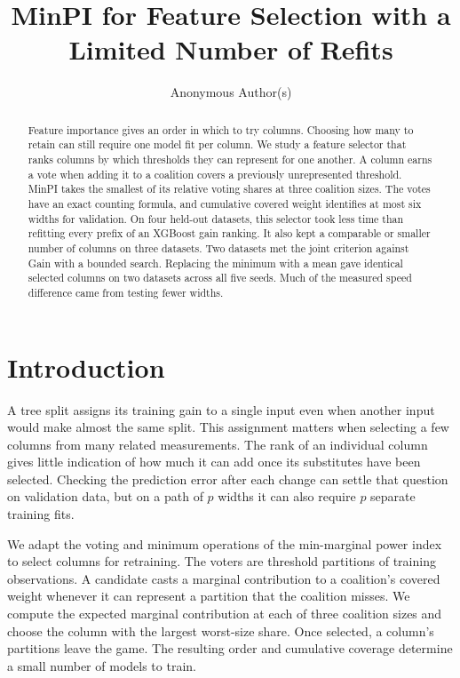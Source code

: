 \documentclass{article}
\title{MinPI for Feature Selection with a Limited Number of Refits}
\author{Anonymous Author(s)}
\begin{document}
\maketitle
\begin{abstract}
Feature importance gives an order in which to try columns. Choosing how many to retain can still require one model fit per column. We study a feature selector that ranks columns by which thresholds they can represent for one another. A column earns a vote when adding it to a coalition covers a previously unrepresented threshold. MinPI takes the smallest of its relative voting shares at three coalition sizes. The votes have an exact counting formula, and cumulative covered weight identifies at most six widths for validation. On four held-out datasets, this selector took less time than refitting every prefix of an XGBoost gain ranking. It also kept a comparable or smaller number of columns on three datasets. Two datasets met the joint criterion against Gain with a bounded search. Replacing the minimum with a mean gave identical selected columns on two datasets across all five seeds. Much of the measured speed difference came from testing fewer widths.
\end{abstract}

\section{Introduction}
A tree split assigns its training gain to a single input even when another input would make almost the same split. This assignment matters when selecting a few columns from many related measurements. The rank of an individual column gives little indication of how much it can add once its substitutes have been selected. Checking the prediction error after each change can settle that question on validation data, but on a path of $p$ widths it can also require $p$ separate training fits.

We adapt the voting and minimum operations of the min-marginal power index~\citep{shi2026minpi} to select columns for retraining. The voters are threshold partitions of training observations. A candidate casts a marginal contribution to a coalition's covered weight whenever it can represent a partition that the coalition misses. We compute the expected marginal contribution at each of three coalition sizes and choose the column with the largest worst-size share. Once selected, a column's partitions leave the game. The resulting order and cumulative coverage determine a small number of models to train.
\end{document}
